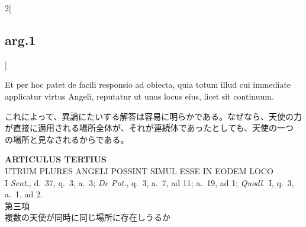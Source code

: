 \documentclass[paper=a4paper,fontsize=10pt,jafontsize=9pt,titlepage]{jlreq}
\begin{document}
\begin{paracol}{2}[\subsection{arg.1}]
\switchcolumn*

Et per hoc patet de facili responsio ad obiecta, quia totum illud cui
immediate applicatur virtus Angeli, reputatur ut unus locus eius, licet
sit continuum.

\switchcolumn

これによって、異論にたいする解答は容易に明らかである。なぜなら、天使の力
 が直接に適用される場所全体が、それが連続体であったとしても、天使の一つ
 の場所と見なされるからである。

\end{paracol}


\newpage
{}
{}
\setcounter{section}{3}
\setcounter{subsection}{0}


\begin{center}
 {\Large {\bfseries ARTICULUS TERTIUS}}\\
 {\large UTRUM PLURES ANGELI POSSINT SIMUL ESSE IN EODEM LOCO}\\
 {\footnotesize I {\itshape Sent.}, d.~37, q.~3, a.~3; {\itshape De
 Pot.}, q.~3, a.~7, ad 11; a.~19, ad 1; {\itshape Quodl}.~I, q.~3, a.~1,
 ad 2.}\\
 {\Large 第三項\\複数の天使が同時に同じ場所に存在しうるか}
\end{center}
\end{document}

